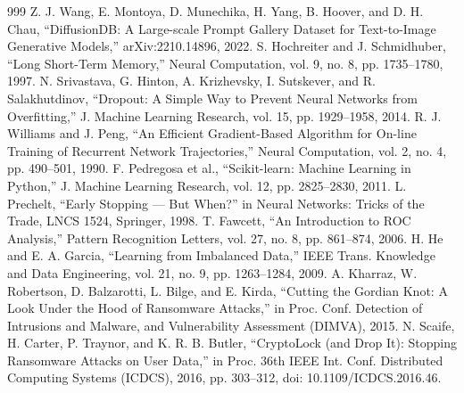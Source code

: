 \begin{thebibliography}{999}
 Z. J. Wang, E. Montoya, D. Munechika, H. Yang, B. Hoover, and D. H. Chau, ``DiffusionDB: A Large-scale Prompt Gallery Dataset for Text-to-Image Generative Models,'' arXiv:2210.14896, 2022.
 S. Hochreiter and J. Schmidhuber, ``Long Short-Term Memory,'' Neural Computation, vol. 9, no. 8, pp. 1735--1780, 1997.
 N. Srivastava, G. Hinton, A. Krizhevsky, I. Sutskever, and R. Salakhutdinov, ``Dropout: A Simple Way to Prevent Neural Networks from Overfitting,'' J. Machine Learning Research, vol. 15, pp. 1929--1958, 2014.
 R. J. Williams and J. Peng, ``An Efficient Gradient-Based Algorithm for On-line Training of Recurrent Network Trajectories,'' Neural Computation, vol. 2, no. 4, pp. 490--501, 1990.
 F. Pedregosa et al., ``Scikit-learn: Machine Learning in Python,'' J. Machine Learning Research, vol. 12, pp. 2825--2830, 2011.
 L. Prechelt, ``Early Stopping --- But When?'' in Neural Networks: Tricks of the Trade, LNCS 1524, Springer, 1998.
 T. Fawcett, ``An Introduction to ROC Analysis,'' Pattern Recognition Letters, vol. 27, no. 8, pp. 861--874, 2006.
 H. He and E. A. Garcia, ``Learning from Imbalanced Data,'' IEEE Trans. Knowledge and Data Engineering, vol. 21, no. 9, pp. 1263--1284, 2009.
 A. Kharraz, W. Robertson, D. Balzarotti, L. Bilge, and E. Kirda, ``Cutting the Gordian Knot: A Look Under the Hood of Ransomware Attacks,'' in Proc. Conf. Detection of Intrusions and Malware, and Vulnerability Assessment (DIMVA), 2015.
 N. Scaife, H. Carter, P. Traynor, and K. R. B. Butler, ``CryptoLock (and Drop It): Stopping Ransomware Attacks on User Data,'' in Proc. 36th IEEE Int. Conf. Distributed Computing Systems (ICDCS), 2016, pp. 303--312, doi: 10.1109/\allowbreak{}ICDCS.2016.46.
\end{thebibliography}
